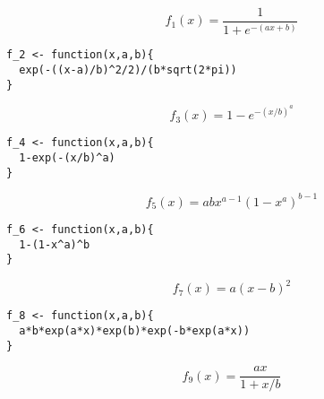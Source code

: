 \documentclass[14pt]{amsart}
\title{}
\author{}
\begin{document}

\clearpage
\vspace{-2in}
$$
f_1(x) = \frac{1}{1+e^{-(ax+b)}}
$$
\clearpage

\vspace{-2in}
\begin{verbatim}
f_2 <- function(x,a,b){
  exp(-((x-a)/b)^2/2)/(b*sqrt(2*pi))
}
\end{verbatim}
\clearpage

\vspace{-2in}

$$
f_3(x) = 1-e^{-(x/b)^a}
$$
\clearpage

\vspace{-2in}
\begin{verbatim}
f_4 <- function(x,a,b){
  1-exp(-(x/b)^a)
}
\end{verbatim}
\clearpage

\vspace{-2in}
$$
f_5(x) =abx^{a-1}(1-x^a)^{b-1}
$$
\clearpage

\vspace{-2in}
\begin{verbatim}
f_6 <- function(x,a,b){
  1-(1-x^a)^b
}
\end{verbatim}
\clearpage

\vspace{-2in}
$$
f_7(x) = a(x-b)^2
$$

\clearpage

\vspace{-2in}
\begin{verbatim}
f_8 <- function(x,a,b){
  a*b*exp(a*x)*exp(b)*exp(-b*exp(a*x))
}
\end{verbatim}
\clearpage

\vspace{-2in}
$$
f_9(x) = \frac{ax}{1+x/b}
$$


\clearpage

\vspace{-2in}
\clearpage

\vspace{-2in}
\clearpage

\vspace{-2in}
\clearpage
\end{document}
